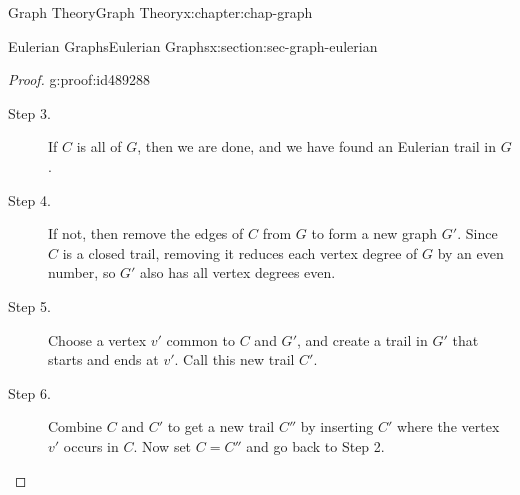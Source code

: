\documentclass[oneside,10pt,]{book}
\numberwithin{equation}{section}
\begin{document}
\begin{chapterptx}{Graph Theory}{}{Graph Theory}{}{}{x:chapter:chap-graph}
\begin{sectionptx}{Eulerian Graphs}{}{Eulerian Graphs}{}{}{x:section:sec-graph-eulerian}
\begin{proof}{}{g:proof:id489288}
\begin{description}
\item[{Step 3.}]If \(C\) is all of \(G\), then we are done, and we have found an Eulerian trail in \(G\).%
\item[{Step 4.}]If not, then remove the edges of \(C\) from \(G\) to form a new graph \(G'\). Since \(C\) is a closed trail, removing it reduces each vertex degree of \(G\) by an even number, so \(G'\) also has all vertex degrees even.%
\item[{Step 5.}]Choose a vertex \(v'\) common to \(C\) and \(G'\), and create a trail in \(G'\) that starts and ends at \(v'\). Call this new trail \(C'\).%
\item[{Step 6.}]Combine \(C\) and \(C'\) to get a new trail \(C''\) by inserting \(C'\) where the vertex \(v'\) occurs in \(C\). Now set \(C = C''\) and go back to Step 2.%
\end{description}
%
\begin{sidebyside}{3}{0.0466666666666667}{0.0466666666666667}{0.0933333333333333}%
\begin{sbspanel}{0.24}%
\end{sbspanel}
\end{sidebyside}
\end{proof}
\end{sectionptx}
\end{chapterptx}
\end{document}

